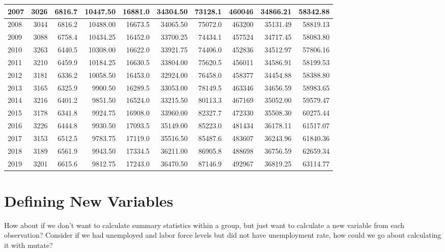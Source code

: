 \documentclass[
]{book}
\begin{document}
\begin{tabular}{l|r|r|r|r|r|r|r|r|r}
\hline
2007 & 3026 & 6816.7 & 10447.50 & 16881.0 & 34304.50 & 73128.1 & 460046 & 34866.21 & 58342.88\\
\hline
2008 & 3044 & 6816.2 & 10488.00 & 16673.5 & 34065.50 & 75072.0 & 463200 & 35131.49 & 58819.13\\
\hline
2009 & 3088 & 6758.4 & 10434.25 & 16452.0 & 33700.25 & 74434.1 & 457524 & 34717.45 & 58083.80\\
\hline
2010 & 3263 & 6440.5 & 10308.00 & 16622.0 & 33921.75 & 74406.0 & 452836 & 34512.97 & 57806.16\\
\hline
2011 & 3210 & 6459.9 & 10184.25 & 16630.5 & 33804.00 & 75620.5 & 456011 & 34586.91 & 58199.53\\
\hline
2012 & 3181 & 6336.2 & 10058.50 & 16453.0 & 32924.00 & 76458.0 & 458377 & 34454.88 & 58388.80\\
\hline
2013 & 3165 & 6325.9 & 9900.50 & 16289.5 & 33053.00 & 78149.5 & 463346 & 34656.59 & 58983.65\\
\hline
2014 & 3216 & 6401.2 & 9851.50 & 16524.0 & 33215.50 & 80113.3 & 467169 & 35052.00 & 59579.47\\
\hline
2015 & 3178 & 6341.8 & 9924.75 & 16908.0 & 33960.00 & 82327.7 & 472330 & 35508.30 & 60275.44\\
\hline
2016 & 3226 & 6444.8 & 9930.50 & 17093.5 & 35149.00 & 85223.0 & 481434 & 36178.11 & 61517.07\\
\hline
2017 & 3153 & 6512.5 & 9783.75 & 17119.0 & 35516.50 & 85487.6 & 483607 & 36243.96 & 61840.36\\
\hline
2018 & 3189 & 6561.9 & 9943.50 & 17334.5 & 36211.00 & 86905.8 & 488698 & 36756.59 & 62659.34\\
\hline
2019 & 3201 & 6615.6 & 9812.75 & 17243.0 & 36470.50 & 87146.9 & 492967 & 36819.25 & 63114.77\\
\hline
\end{tabular}

\hypertarget{defining-new-variables}{%
\section{Defining New Variables}\label{defining-new-variables}}

How about if we don't want to calculate summary statistics within a group, but just want to calculate a new variable from each observation? Consider if we had unemployed and labor force levels but did not have unemployment rate, how could we go about calculating it with mutate?
\end{document}
